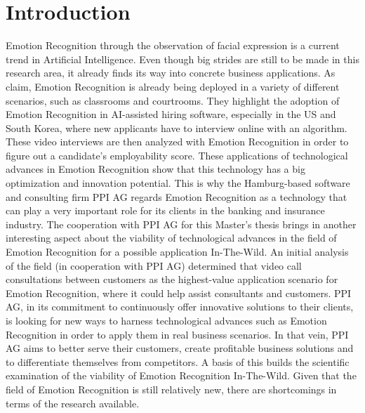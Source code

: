 
\chapter{Introduction}

Emotion Recognition through the observation of facial expression is a current trend in Artificial Intelligence. Even though big strides are still to be made in this research area, it already finds its way into concrete business applications. As \citet{Chen:2020:EmotionAI} claim, Emotion Recognition is already being deployed in a variety of different scenarios, such as classrooms and courtrooms. They highlight the adoption of Emotion Recognition in AI-assisted hiring software, especially in the US and South Korea, where new applicants have to interview online with an algorithm. These video interviews are then analyzed with Emotion Recognition in order to figure out a candidate's employability score.
\newline\newline
These applications of technological advances in Emotion Recognition show that this technology has a big optimization and innovation potential. This is why the Hamburg-based software and consulting firm PPI AG regards Emotion Recognition as a technology that can play a very important role for its clients in the banking and insurance industry. The cooperation with PPI AG for this Master's thesis brings in another interesting aspect about the viability of technological advances in the field of Emotion Recognition for a possible application In-The-Wild. An initial analysis of the field (in cooperation with PPI AG) determined that video call consultations between customers as the highest-value application scenario for Emotion Recognition, where it could help assist consultants and customers.
\newline\newline
PPI AG, in its commitment to continuously offer innovative solutions to their clients, is looking for new ways to harness technological advances such as Emotion Recognition in order to apply them in real business scenarios. In that vein, PPI AG aims to better serve their customers, create profitable business solutions and to differentiate themselves from competitors. A basis of this builds the scientific examination of the viability of Emotion Recognition In-The-Wild. Given that the field of Emotion Recognition is still relatively new, there are shortcomings in terms of the research available.
\newline\newline
